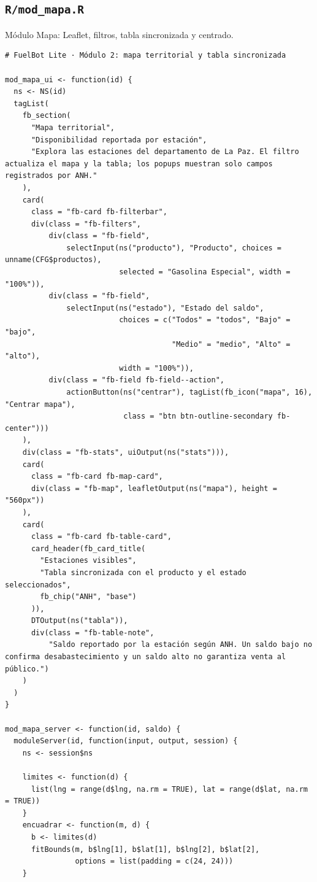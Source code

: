 \subsection{\texttt{R/mod\_mapa.R}}
Módulo Mapa: Leaflet, filtros, tabla sincronizada y centrado.
\begin{lstlisting}[style=anexoR]
# FuelBot Lite · Módulo 2: mapa territorial y tabla sincronizada

mod_mapa_ui <- function(id) {
  ns <- NS(id)
  tagList(
    fb_section(
      "Mapa territorial",
      "Disponibilidad reportada por estación",
      "Explora las estaciones del departamento de La Paz. El filtro actualiza el mapa y la tabla; los popups muestran solo campos registrados por ANH."
    ),
    card(
      class = "fb-card fb-filterbar",
      div(class = "fb-filters",
          div(class = "fb-field",
              selectInput(ns("producto"), "Producto", choices = unname(CFG$productos),
                          selected = "Gasolina Especial", width = "100%")),
          div(class = "fb-field",
              selectInput(ns("estado"), "Estado del saldo",
                          choices = c("Todos" = "todos", "Bajo" = "bajo",
                                      "Medio" = "medio", "Alto" = "alto"),
                          width = "100%")),
          div(class = "fb-field fb-field--action",
              actionButton(ns("centrar"), tagList(fb_icon("mapa", 16), "Centrar mapa"),
                           class = "btn btn-outline-secondary fb-center")))
    ),
    div(class = "fb-stats", uiOutput(ns("stats"))),
    card(
      class = "fb-card fb-map-card",
      div(class = "fb-map", leafletOutput(ns("mapa"), height = "560px"))
    ),
    card(
      class = "fb-card fb-table-card",
      card_header(fb_card_title(
        "Estaciones visibles",
        "Tabla sincronizada con el producto y el estado seleccionados",
        fb_chip("ANH", "base")
      )),
      DTOutput(ns("tabla")),
      div(class = "fb-table-note",
          "Saldo reportado por la estación según ANH. Un saldo bajo no confirma desabastecimiento y un saldo alto no garantiza venta al público.")
    )
  )
}

mod_mapa_server <- function(id, saldo) {
  moduleServer(id, function(input, output, session) {
    ns <- session$ns

    limites <- function(d) {
      list(lng = range(d$lng, na.rm = TRUE), lat = range(d$lat, na.rm = TRUE))
    }
    encuadrar <- function(m, d) {
      b <- limites(d)
      fitBounds(m, b$lng[1], b$lat[1], b$lng[2], b$lat[2],
                options = list(padding = c(24, 24)))
    }


\end{lstlisting}
